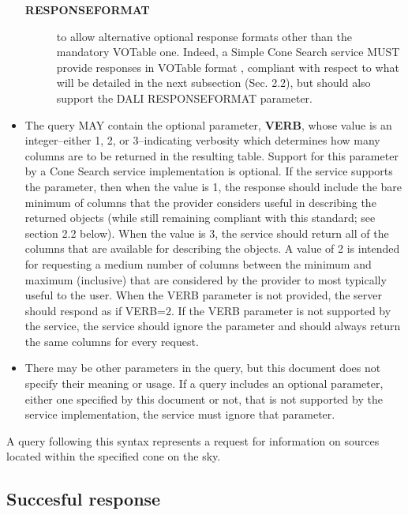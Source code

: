 \documentclass[11pt,a4paper]{ivoa}
\begin{document}
\begin{itemize}
\begin{description}
				\item[\textbf{RESPONSEFORMAT}] to allow alternative optional response
					formats other than the mandatory VOTable one. Indeed, a Simple
					Cone Search service MUST provide responses in VOTable format \citep{2025ivoa.spec.0116O},
					compliant with respect to what will
					be detailed in the next subsection (Sec. 2.2), but should also
					support the DALI RESPONSEFORMAT parameter.
			\end{description}
		\item The query MAY contain the optional parameter,
			\textbf{VERB}, whose value is an integer--either 1, 2, or 3--indicating
			verbosity which determines how many columns are to be returned in the
			resulting table. Support for this parameter by a Cone Search service
			implementation is optional. If the service supports the parameter, then
			when the value is 1, the response should include the bare minimum of
			columns that the provider considers useful in describing the returned
			objects (while still remaining compliant with this standard; see section
			2.2 below). When the value is 3, the service should return all of the
			columns that are available for describing the objects. A value of 2 is
			intended for requesting a medium number of columns between the minimum
			and maximum (inclusive) that are considered by the provider to most
			typically useful to the user. When the VERB parameter is not provided,
			the server should respond as if VERB=2. If the VERB parameter is not
			supported by the service, the service should ignore the parameter and
			should always return the same columns for every request.
		\item There may be other parameters in the query, but this document does not
			specify their meaning or usage. If a query includes an optional parameter,
			either one specified by this document or not, that is not supported by
			the service implementation, the service must ignore that parameter.
	\end{itemize}
	
	A query following this syntax represents a request for
	information on sources located within the specified cone on the sky.

\subsection{Succesful response}
\label{subsec:response}
\end{document}
